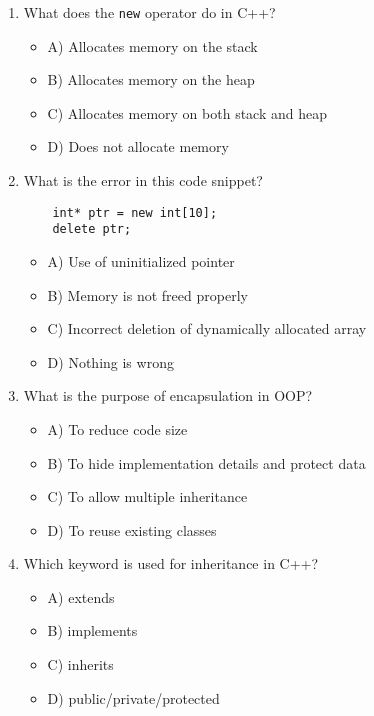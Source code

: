 \documentclass[a4paper,12pt]{article}
\begin{document}
\begin{enumerate}
    \item What does the \verb|new| operator do in C++?
    \begin{itemize}
        \item A) Allocates memory on the stack
        \item B) Allocates memory on the heap
        \item C) Allocates memory on both stack and heap
        \item D) Does not allocate memory
    \end{itemize}

\newpage

    \item What is the error in this code snippet?

    \lstset{language=C}
    \begin{lstlisting}
    int* ptr = new int[10];
    delete ptr;
    \end{lstlisting}
    
    \begin{itemize}
        \item A) Use of uninitialized pointer
        \item B) Memory is not freed properly
        \item C) Incorrect deletion of dynamically allocated array %
        \item D) Nothing is wrong
    \end{itemize}

    \item What is the purpose of encapsulation in OOP?
    \begin{itemize}
        \item A) To reduce code size
        \item B) To hide implementation details and protect data %
        \item C) To allow multiple inheritance
        \item D) To reuse existing classes
    \end{itemize}

    \item Which keyword is used for inheritance in C++?
    \begin{itemize}
        \item A) extends
        \item B) implements
        \item C) inherits
        \item D) public/private/protected %
    \end{itemize}


\end{enumerate}
\end{document}
